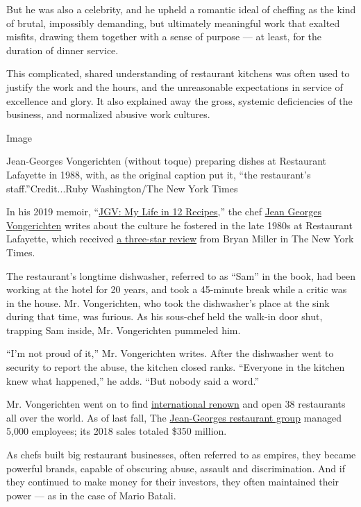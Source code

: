 But he was also a celebrity, and he upheld a romantic ideal of cheffing
as the kind of brutal, impossibly demanding, but ultimately meaningful
work that exalted misfits, drawing them together with a sense of purpose
--- at least, for the duration of dinner service.

This complicated, shared understanding of restaurant kitchens was often
used to justify the work and the hours, and the unreasonable
expectations in service of excellence and glory. It also explained away
the gross, systemic deficiencies of the business, and normalized abusive
work cultures.

Image

Jean-Georges Vongerichten (without toque) preparing dishes at Restaurant
Lafayette in 1988, with, as the original caption put it, ``the
restaurant's staff.''Credit...Ruby Washington/The New York Times

In his 2019 memoir,
``\href{https://wwnorton.com/books/9780393608489}{JGV: My Life in 12
Recipes},'' the chef
\href{https://www.nytimes3xbfgragh.onion/2020/01/14/dining/jean-georges-vongerichten.html}{Jean
Georges Vongerichten} writes about the culture he fostered in the late
1980s at Restaurant Lafayette, which received
\href{https://www.nytimes3xbfgragh.onion/1988/04/22/arts/restaurants-067888.html}{a
three-star review} from Bryan Miller in The New York Times.

The restaurant's longtime dishwasher, referred to as ``Sam'' in the
book, had been working at the hotel for 20 years, and took a 45-minute
break while a critic was in the house. Mr. Vongerichten, who took the
dishwasher's place at the sink during that time, was furious. As his
sous-chef held the walk-in door shut, trapping Sam inside, Mr.
Vongerichten pummeled him.

``I'm not proud of it,'' Mr. Vongerichten writes. After the dishwasher
went to security to report the abuse, the kitchen closed ranks.
``Everyone in the kitchen knew what happened,'' he adds. ``But nobody
said a word.''

Mr. Vongerichten went on to find
\href{https://www.nytimes3xbfgragh.onion/2019/10/17/magazine/jean-georges-restaurants.html}{international
renown} and open 38 restaurants all over the world. As of last fall, The
\href{https://www.jean-georges.com/restaurants/united-states}{Jean-Georges
restaurant group} managed 5,000 employees; its 2018 sales totaled \$350
million.

As chefs built big restaurant businesses, often referred to as empires,
they became powerful brands, capable of obscuring abuse, assault and
discrimination. And if they continued to make money for their investors,
they often maintained their power --- as in the case of Mario Batali.

